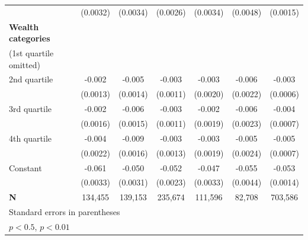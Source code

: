{\begin{tabular}{l*{6}{c}}
                    &    (0.0032)        &    (0.0034)        &    (0.0026)        &    (0.0034)        &    (0.0048)        &    (0.0015)        \\
\addlinespace
\textbf{Wealth categories} \\ (1st quartile omitted)&                    &                    &                    &                    &                    &                    \\
\addlinespace
\hspace*{1em}2nd quartile        &      -0.002\sym{*} &      -0.005\sym{**}&      -0.003\sym{*} &      -0.003\sym{*} &      -0.006\sym{**}&      -0.003\sym{**}\\
                    &    (0.0013)        &    (0.0014)        &    (0.0011)        &    (0.0020)        &    (0.0022)        &    (0.0006)        \\
\addlinespace
\hspace*{1em}3rd quartile        &      -0.002\sym{*} &      -0.006\sym{**}&      -0.003\sym{**}&      -0.002\sym{*} &      -0.006\sym{**}&      -0.004\sym{**}\\
                    &    (0.0016)        &    (0.0015)        &    (0.0011)        &    (0.0019)        &    (0.0023)        &    (0.0007)        \\
\addlinespace
\hspace*{1em}4th quartile        &      -0.004\sym{*} &      -0.009\sym{**}&      -0.003\sym{*} &      -0.003\sym{*} &      -0.005\sym{*} &      -0.005\sym{**}\\
                    &    (0.0022)        &    (0.0016)        &    (0.0013)        &    (0.0019)        &    (0.0024)        &    (0.0007)        \\
\addlinespace
\hspace*{1em}Constant            &      -0.061\sym{**}&      -0.050\sym{**}&      -0.052\sym{**}&      -0.047\sym{**}&      -0.055\sym{**}&      -0.053\sym{**}\\
                    &    (0.0033)        &    (0.0031)        &    (0.0023)        &    (0.0033)        &    (0.0044)        &    (0.0014)        \\
\midrule
\textbf{N}          &     134,455        &     139,153        &     235,674        &     111,596        &      82,708        &     703,586        \\
\bottomrule
\multicolumn{7}{l}{\footnotesize Standard errors in parentheses}\\
\multicolumn{7}{l}{\footnotesize \sym{*} \(p<0.5\), \sym{**} \(p<0.01\)}\\
\end{tabular}
}
